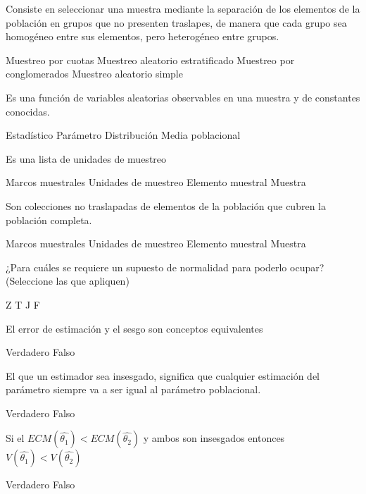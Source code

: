\documentclass[addpoints]{exam}
\theoremstyle{mytheor}
\begin{document}
  \begin{questions}
  
  \question Consiste en seleccionar una muestra mediante la separación de los elementos de la población en grupos que no presenten traslapes, de manera que cada grupo sea homogéneo entre sus elementos, pero heterogéneo entre grupos.
  \begin{checkboxes}
  \choice Muestreo por cuotas
  \choice Muestreo aleatorio estratificado
  \choice Muestreo por conglomerados
  \choice Muestreo aleatorio simple
  \end{checkboxes}
  
  
    \question Es una función de variables aleatorias observables en una
muestra y de constantes conocidas.
  \begin{checkboxes}
  \choice Estadístico
  \choice Parámetro
  \choice Distribución
  \choice Media poblacional
  \end{checkboxes}
  
  \question Es una lista de unidades de muestreo
  \begin{checkboxes}
  \choice Marcos muestrales
  \choice Unidades de muestreo
  \choice Elemento muestral
  \choice Muestra
  \end{checkboxes}
  
  
  \question Son colecciones no traslapadas de elementos de la población que cubren la población completa.
  \begin{checkboxes}
  \choice Marcos muestrales
  \choice Unidades de muestreo
  \choice Elemento muestral
  \choice Muestra
  \end{checkboxes}
  
  \question ¿Para cuáles se requiere un supuesto de normalidad para poderlo ocupar? (Seleccione las que apliquen)
  \begin{checkboxes}
  \choice Z
  \choice T
  \choice J
  \choice F
  \end{checkboxes}
  
    \question El error de estimación y el sesgo son conceptos equivalentes
  \begin{checkboxes}
  \choice Verdadero
  \choice Falso
  \end{checkboxes}
  
  \question El que un estimador sea insesgado, significa que cualquier estimación del parámetro siempre va a ser igual al parámetro poblacional.
  \begin{checkboxes}
  \choice Verdadero
  \choice Falso
  \end{checkboxes}
  
  \question Si el $ECM(\hat{\theta_1}) < ECM(\hat{\theta_2})$ y ambos son insesgados entonces $V(\hat{\theta_1}) < V(\hat{\theta_2})$
  \begin{checkboxes}
  \choice Verdadero
  \choice Falso
  \end{checkboxes}
  
  
  
  \end{questions}
\end{document}
